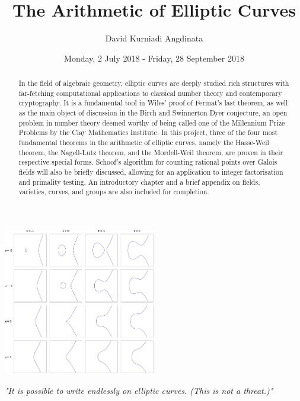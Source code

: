 \documentclass{article}
\title{The Arithmetic of Elliptic Curves}
\author{David Kurniadi Angdinata}
\date{Monday, 2 July 2018 - Friday, 28 September 2018}
\theoremstyle{definition}\newtheorem*{definition}{Definition}
\theoremstyle{definition}\newtheorem*{example}{Example}
\theoremstyle{definition}\newtheorem*{remark}{Remark}
\begin{document}
\maketitle

\vspace{1cm}

\begin{center}
\includegraphics*[width=0.5\textwidth]{img/EllipticCurveCatalog.png}
\end{center}

\vfill

\begin{center}
\emph{"It is possible to write endlessly on elliptic curves. (This is not a threat.)"\cite{lang}} \\
\end{center}

\vspace{1cm}

\begin{abstract}
In the field of algebraic geometry, elliptic curves are deeply studied rich structures with far-fetching computational applications to classical number theory and contemporary cryptography. It is a fundamental tool in Wiles' proof of Fermat's last theorem, as well as the main object of discussion in the Birch and Swinnerton-Dyer conjecture, an open problem in number theory deemed worthy of being called one of the Millennium Prize Problems by the Clay Mathematics Institute. In this project, three of the four most fundamental theorems in the arithmetic of elliptic curves, namely the Hasse-Weil theorem, the Nagell-Lutz theorem, and the Mordell-Weil theorem, are proven in their respective special forms. Schoof's algorithm for counting rational points over Galois fields will also be briefly discussed, allowing for an application to integer factorisation and primality testing. An introductory chapter and a brief appendix on fields, varieties, curves, and groups are also included for completion.
\end{abstract}
\end{document}
